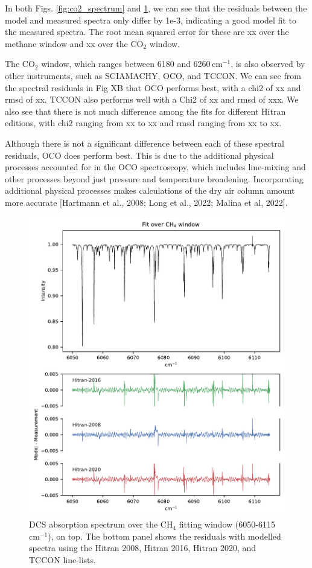 \documentclass[amt, manuscript]{copernicus}
\begin{document}
In both Figs. \ref{fig:co2_spectrum} and \ref{fig:ch4_spectrum}, we can see that the residuals between the model and measured spectra only differ by 1e-3, indicating a good model fit to the measured spectra. The root mean squared error for these are xx over the methane window and xx over the CO$_2$ window.

The CO$_2$ window, which ranges between 6180 and 6260\,cm$^{-1}$, is also observed by other instruments, such as SCIAMACHY, OCO, and TCCON. We can see from the spectral residuals in Fig XB that OCO performs best, with a chi2 of xx and rmsd of xx. TCCON also performs well with a Chi2 of xx and rmsd of xxx. We also see that there is not much difference among the fits for different Hitran editions, with chi2 ranging from xx to xx and rmsd ranging from xx to xx.

Although there is not a significant difference between each of these spectral residuals, OCO does perform best. This is due to the additional physical processes accounted for in the OCO spectroscopy, which includes line-mixing and other processes beyond just pressure and temperature broadening. Incorporating additional physical processes makes calculations of the dry air column amount more accurate [Hartmann et al., 2008; Long et al., 2022; Malina et al, 2022].

\begin{figure}
  \centering
  \includegraphics{ch4_fit.pdf}
  \caption{DCS absorption spectrum over the CH$_4$ fitting window (6050-6115\,cm$^{-1}$), on top. The bottom panel shows the residuals with modelled spectra using the Hitran 2008, Hitran 2016, Hitran 2020, and TCCON line-lists.}
  \label{fig:ch4_spectrum}
\end{figure}
\end{document}
